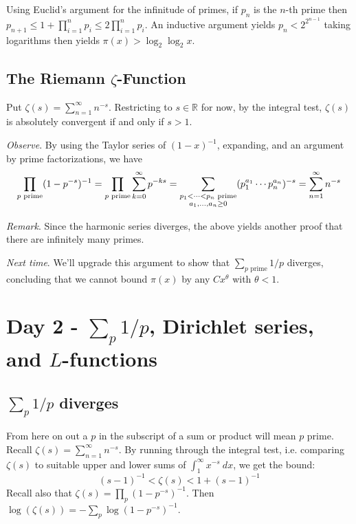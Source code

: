 \documentclass[12pt]{article}
\newcommand{\reals}{\mathbb{R}}
\numberwithin{equation}{section}
\numberwithin{thm}{section}
\numberwithin{lemma}{section}
\numberwithin{cor}{section}
\begin{document}
Using Euclid's argument for the infinitude of primes, if $p_n$ is the $n$-th prime then $p_{n + 1} \leq 1 + \prod_{i = 1}^n p_i \leq 2 \prod_{i = 1}^n p_i$. An inductive argument yields $p_n < 2^{2^{n-1}}$ taking logarithms then yields $\pi(x) > \log_2 \log_2 x$.

\subsection{The Riemann $\zeta$-Function}

Put $\zeta(s) = \sum_{n = 1}^{\infty} n^{-s}$. Restricting to $s \in \reals$ for now, by the integral test, $\zeta(s)$ is absolutely convergent if and only if $s > 1$. 

\textit{Observe}. By using the Taylor series of $(1 - x)^{-1}$, expanding, and an argument by prime factorizations, we have \[\prod_{p \text{ prime}} (1 - p^{-s})^{-1} = \prod_{p \text{ prime}} \sum_{k = 0}^{\infty} p^{-ks} = \sum_{\underset{\mathlarger{a_1, ..., a_n \geq 0}}{p_1 < \cdots < p_n \text{ prime}}} (p_1^{a_1} \cdots p_n^{a_n})^{-s} = \sum_{n = 1}^{\infty} n^{-s}\]

\textit{Remark}. Since the harmonic series diverges, the above yields another proof that there are infinitely many primes.

\textit{Next time}. We'll upgrade this argument to show that $\sum_{p \text{ prime}} 1/p$ diverges, concluding that we cannot bound $\pi(x)$ by any $C x^{\theta}$ with $\theta < 1$.

\section{Day 2 - $\sum_p 1/p$, Dirichlet series, and $L$-functions}

\subsection{$\sum_p 1/p$ diverges}

From here on out a $p$ in the subscript of a sum or product will mean $p$ prime. Recall $\zeta(s) = \sum_{n = 1}^{\infty} n^{-s}$. By running through the integral test, i.e. comparing $\zeta(s)$ to suitable upper and lower sums of $\int_1^{\infty} x^{-s} \ dx$, we get the bound: \begin{equation}\label{ZetaInequality1}(s - 1)^{-1} < \zeta(s) < 1 + (s - 1)^{-1}\end{equation} Recall also that $\zeta(s) = \prod_p (1 - p^{-s})^{-1}$. Then $\log (\zeta (s)) = - \sum_p \log (1 - p^{-s})^{-1}$.
\end{document}
